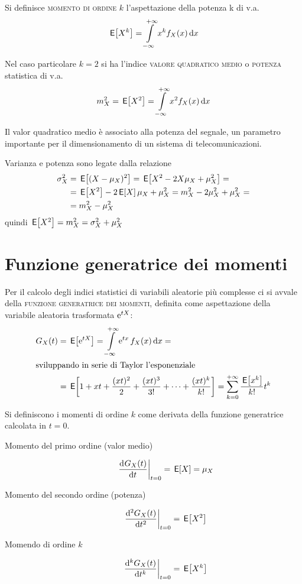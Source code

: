 Si definisce \textsc{momento di ordine $k$} l'aspettazione della potenza k di v.a.
\begin{equation}
\E{X^k}=\intinf{x^k f_X(x)}{x}
\end{equation}

Nel caso particolare $k=2$ si ha l'indice \textsc{valore quadratico medio} o \textsc{potenza} statistica di v.a.
\begin{equation}\label{eq:v_a_valore_quad_medio}
m^2_X=\E{X^2}=\intinf{x^2 f_X(x)}{x}\end{equation}
\begin{nota}Il valor quadratico medio è associato alla potenza del segnale, un parametro importante per il dimensionamento di un sistema di telecomunicazioni.\end{nota}
Varianza e potenza sono legate dalla relazione
\begin{equation}\begin{split}
\sigma^2_X&=\E{(X-\mu_X)^2}=\E{X^2-2X\mu_X+\mu^2_X}=\\
&=\E{X^2}-2\E{X}\mu_X+\mu^2_X=m^2_X-2\mu^2_X+\mu^2_X=\\&=m^2_X-\mu^2_X\end{split}\end{equation}
quindi $\E{X^2}=m^2_X=\sigma^2_X+\mu^2_X$

\section{Funzione generatrice dei momenti}
Per il calcolo degli indici statistici di variabili aleatorie più complesse ci si avvale della \textsc{funzione generatrice dei momenti}, definita come aspettazione della variabile aleatoria trasformata $\e{t X}$:
\begin{equation}\begin{split}
G_X(t)&=\E{\e{t X}}=\intinf{\e{t x}f_X(x)}{x}=\\
\intertext{sviluppando in serie di Taylor l'esponenziale}
&=\E{1+x t+\frac{(x t)^2}{2}+\frac{(x t)^3}{3!}+\dots+\frac{(x t)^k}{k!}}=\sum_{k=0}^{+\infty}{\frac{\E{x^k}}{k!}t^k}
\end{split}\end{equation}

Si definiscono i momenti di ordine $k$ come derivata della funzione generatrice calcolata in $t=0$.

\begin{description}
\item[Momento del primo ordine (valor medio)]
\begin{equation}
\restrict{\deriv{G_X(t)}{t}}{t=0}=\E{X}=\mu_X
\end{equation}
\item[Momento del secondo ordine (potenza)]
\begin{equation}
\restrict{\deriv[2]{G_X(t)}{t}}{t=0}=\E{X^2}
\end{equation}
\item[Momendo di ordine $k$]
\begin{equation}
\restrict{\deriv[k]{G_X(t)}{t}}{t=0}=\E{X^k}
\end{equation}
\end{description}

